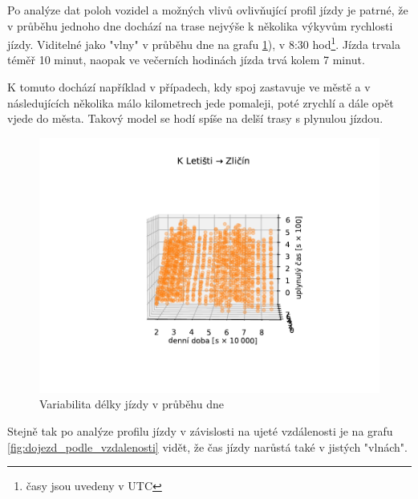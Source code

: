 Po analýze dat poloh vozidel a možných vlivů ovlivňující profil jízdy je patrné, že v průběhu jednoho dne dochází na trase nejvýše k několika výkyvům rychlosti jízdy. Viditelné jako "vlny" v průběhu dne na grafu \ref{fig:dojezd_ve_fazich_dne}), v 8:30 hod\footnote{časy jsou uvedeny v UTC}. Jízda trvala téměř 10 minut, naopak ve večerních hodinách jízda trvá kolem 7 minut.


\bigbreak


K tomuto dochází například v případech, kdy spoj zastavuje ve městě a v následujících několika málo kilometrech jede pomaleji, poté zrychlí a dále opět vjede do města. Takový model se hodí spíše na delší trasy s plynulou jízdou.


\begin{figure}
\centering
  \includegraphics[width=\linewidth]{../img/dojezd_ve_fazich_dne}
  \caption{Variabilita délky jízdy v průběhu dne}
  \label{fig:dojezd_ve_fazich_dne}
\end{figure}


Stejně tak po analýze profilu jízdy v závislosti na ujeté vzdálenosti je na grafu \ref{fig:dojezd_podle_vzdalenosti} vidět, že čas jízdy narůstá také v jistých "vlnách".


